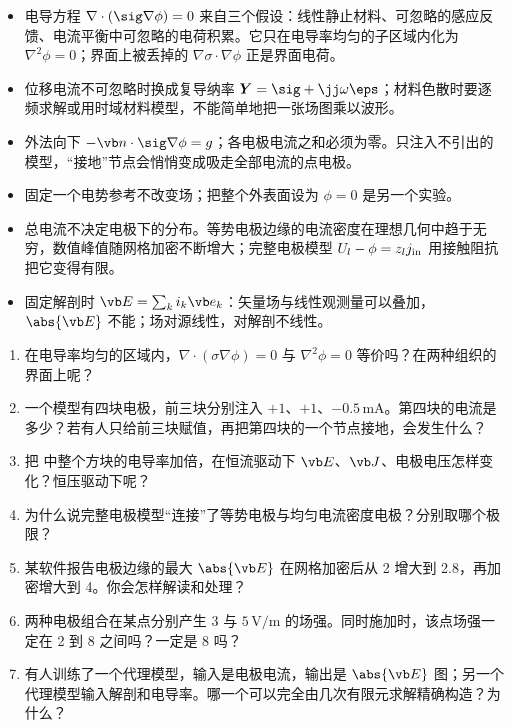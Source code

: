 \begin{takeaways}
\begin{itemize}
\item 电导方程 $\nabla\cdot(\sig\nabla\phi)=0$ 来自三个假设：线性静止材料、可忽略的感应反馈、电流平衡中可忽略的电荷积累。它只在电导率均匀的子区域内化为 $\nabla^2\phi=0$；界面上被丢掉的 $\nabla\sigma\cdot\nabla\phi$ 正是界面电荷。
\item 位移电流不可忽略时换成复导纳率 $\boldsymbol Y=\sig+\jj\omega\eps$；材料色散时要逐频求解或用时域材料模型，不能简单地把一张场图乘以波形。
\item 外法向下 $-\vb n\cdot\sig\nabla\phi=g$；各电极电流之和必须为零。只注入不引出的模型，“接地”节点会悄悄变成吸走全部电流的点电极。
\item 固定一个电势参考不改变场；把整个外表面设为 $\phi=0$ 是另一个实验。
\item 总电流不决定电极下的分布。等势电极边缘的电流密度在理想几何中趋于无穷，数值峰值随网格加密不断增大；完整电极模型 $U_l-\phi=z_lj_{\rm in}$ 用接触阻抗把它变得有限。
\item 固定解剖时 $\vb E=\sum_ki_k\vb e_k$：矢量场与线性观测量可以叠加，$\abs{\vb E}$ 不能；场对源线性，对解剖不线性。
\end{itemize}
\end{takeaways}

\begin{selfcheck}
\begin{enumerate}
\item 在电导率均匀的区域内，$\nabla\cdot(\sigma\nabla\phi)=0$ 与 $\nabla^2\phi=0$ 等价吗？在两种组织的界面上呢？
\item 一个模型有四块电极，前三块分别注入 $+1$、$+1$、$-0.5\,\mathrm{mA}$。第四块的电流是多少？若有人只给前三块赋值，再把第四块的一个节点接地，会发生什么？
\item 把 中整个方块的电导率加倍，在恒流驱动下 $\vb E$、$\vb J$、电极电压怎样变化？恒压驱动下呢？
\item 为什么说完整电极模型“连接”了等势电极与均匀电流密度电极？分别取哪个极限？
\item 某软件报告电极边缘的最大 $\abs{\vb E}$ 在网格加密后从 2 增大到 2.8，再加密增大到 4。你会怎样解读和处理？
\item 两种电极组合在某点分别产生 $3$ 与 $5\,\mathrm{V/m}$ 的场强。同时施加时，该点场强一定在 2 到 8 之间吗？一定是 8 吗？
\item 有人训练了一个代理模型，输入是电极电流，输出是 $\abs{\vb E}$ 图；另一个代理模型输入解剖和电导率。哪一个可以完全由几次有限元求解精确构造？为什么？
\end{enumerate}
\end{selfcheck}

